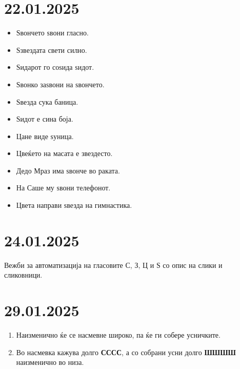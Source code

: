 \documentclass[a5paper,12pt]{article}
\newenvironment{instruction}{%
  \begin{tcolorbox}[colback=white,colframe=accentcolor,title={\textbf{Инструкции}},fonttitle=\bfseries] 
}{%
  \end{tcolorbox}
}
\begin{document}
\section{22.01.2025}
\begin{itemize}
  \item Ѕвончето ѕвони гласно.
  \item Ѕзвездата свети силно.
  \item Ѕидарот го соѕида ѕидот.
  \item Ѕвонко заѕвони на ѕвончето.
  \item Ѕвезда сука баница.
  \item Ѕидот е сина боја.
  \item Цане виде ѕуница.
  \item Цвеќето на масата е звездесто.
  \item Дедо Мраз има ѕвонче во раката.
  \item На Саше му ѕвони телефонот.
  \item Цвета направи ѕвезда на гимнастика.
\end{itemize}

\section{24.01.2025}
Вежби за автоматизација на гласовите С, З, Ц и Ѕ со опис на слики и сликовници.

\section{29.01.2025}
\begin{instruction}
  \begin{enumerate}
    \item Наизменично ќе се насмевне широко, па ќе ги собере усничките.
    \item Во насмевка кажува долго \textbf{СССС}, а со собрани усни долго \textbf{ШШШШ} наизменично во низа.
  \end{enumerate}
\end{instruction}
\end{document}
